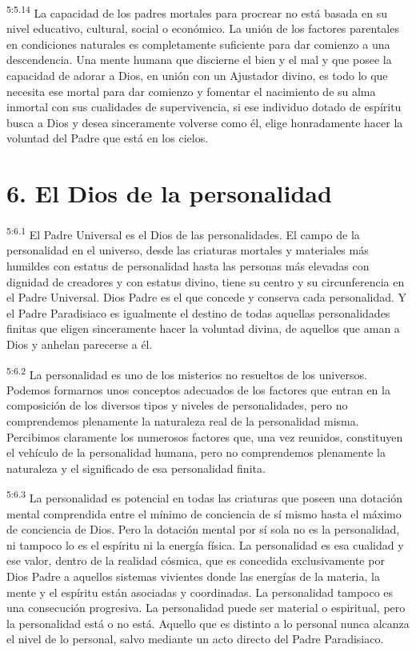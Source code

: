 \par
\textsuperscript{5:5.14} La capacidad de los padres mortales para procrear no está basada en su nivel educativo, cultural, social o económico. La unión de los factores parentales en condiciones naturales es completamente suficiente para dar comienzo a una descendencia. Una mente humana que discierne el bien y el mal y que posee la capacidad de adorar a Dios, en unión con un Ajustador divino, es todo lo que necesita ese mortal para dar comienzo y fomentar el nacimiento de su alma inmortal con sus cualidades de supervivencia, si ese individuo dotado de espíritu busca a Dios y desea sinceramente volverse como él, elige honradamente hacer la voluntad del Padre que está en los cielos.

\section*{6. El Dios de la personalidad}
\par
\textsuperscript{5:6.1} El Padre Universal es el Dios de las personalidades. El campo de la personalidad en el universo, desde las criaturas mortales y materiales más humildes con estatus de personalidad hasta las personas más elevadas con dignidad de creadores y con estatus divino, tiene su centro y su circunferencia en el Padre Universal. Dios Padre es el que concede y conserva cada personalidad. Y el Padre Paradisiaco es igualmente el destino de todas aquellas personalidades finitas que eligen sinceramente hacer la voluntad divina, de aquellos que aman a Dios y anhelan parecerse a él.

\par
\textsuperscript{5:6.2} La personalidad es uno de los misterios no resueltos de los universos. Podemos formarnos unos conceptos adecuados de los factores que entran en la composición de los diversos tipos y niveles de personalidades, pero no comprendemos plenamente la naturaleza real de la personalidad misma. Percibimos claramente los numerosos factores que, una vez reunidos, constituyen el vehículo de la personalidad humana, pero no comprendemos plenamente la naturaleza y el significado de esa personalidad finita.

\par
\textsuperscript{5:6.3} La personalidad es potencial en todas las criaturas que poseen una dotación mental comprendida entre el mínimo de conciencia de sí mismo hasta el máximo de conciencia de Dios. Pero la dotación mental por sí sola no es la personalidad, ni tampoco lo es el espíritu ni la energía física. La personalidad es esa cualidad y ese valor, dentro de la realidad cósmica, que es concedida exclusivamente por Dios Padre a aquellos sistemas vivientes donde las energías de la materia, la mente y el espíritu están asociadas y coordinadas. La personalidad tampoco es una consecución progresiva. La personalidad puede ser material o espiritual, pero la personalidad está o no está. Aquello que es distinto a lo personal nunca alcanza el nivel de lo personal, salvo mediante un acto directo del Padre Paradisiaco.

